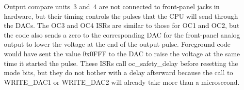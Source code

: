 Output compare units~3 and~4 are not connected to front-panel jacks in
hardware, but their timing controls the pulses that the CPU will send
through the DACs.  The OC3 and OC4 ISRs are similar to those for OC1 and
OC2, but the code also sends a zero to the corresponding DAC for the
front-panel analog output to lower the voltage at the end of the output
pulse.  Foreground code would have sent the value 0x0FFF to the DAC to raise
the voltage at the same time it started the pulse.  These ISRs call
oc\_safety\_delay before resetting the mode bits, but they do not bother
with a delay afterward because the call to WRITE\_DAC1 or WRITE\_DAC2 will
already take more than a microsecond.
